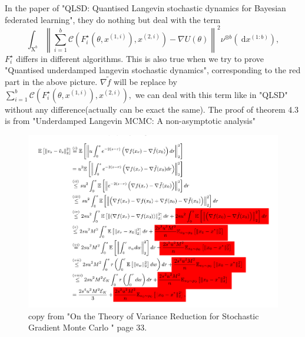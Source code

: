 \documentclass[12pt,a4paper]{article}
\begin{document}
\newpage

In the paper of "QLSD: Quantised Langevin stochastic dynamics for Bayesian federated learning", they do nothing but deal with the term
\begin{equation*}
	\int_{\mathrm{X}^{b}}\left\|\sum_{i=1}^{b} \mathscr{C}\left(F_{i}^{\star}\left(\theta, x^{(1, i)}\right), x^{(2, i)}\right)-\nabla U(\theta)\right\|^{2} \nu^{\otimes b}\left(\mathrm{~d} x^{(1: b)}\right),
\end{equation*}
$F^{\star}_i$ differs in different algorithms.
\newline
This is also true when we try to prove "Quantised underdamped langevin stochastic dynamics", corresponding to the red part in the above picture. $\nabla \tilde{f}$ will be replace by $\sum_{i=1}^{b} \mathscr{C}\left(F_{i}^{\star}\left(\theta, x^{(1, i)}\right), x^{(2, i)}\right),$ we can deal with this term like in "QLSD" without any difference(actually can be exact the same). The proof of theorem 4.3 is from "Underdamped Langevin MCMC: A non-asymptotic analysis"




\begin{figure}
	\centering
	\includegraphics[width=0.7\linewidth]{jietu}
	\caption{copy from "On the Theory of Variance Reduction for Stochastic Gradient Monte Carlo " page 33.}
	\label{fig:jietu}
\end{figure}
\end{document}
